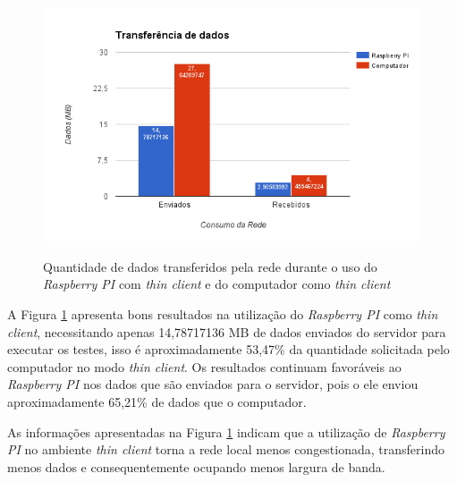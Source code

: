 \documentclass[
	12pt,				%
	openright,			%
	twoside,			%
	a4paper,			%
	chapter=TITLE,		%
	english,			%
	brazil				%
	]{abntex2}
\begin{document}
\begin{figure}[!htb]
\centering
\caption{Quantidade de dados transferidos pela rede durante o uso do \textit{Raspberry PI} com \textit{thin client} e do computador como \textit{thin client}}
\includegraphics[scale=0.8]{Imagens/net}
\label{fig:net}
\end{figure}

A Figura \ref{fig:net} apresenta bons resultados na utilização do \textit{Raspberry PI} como \textit{thin client}, necessitando apenas 14,78717136 MB de dados enviados  do servidor para executar os testes, isso é aproximadamente 53,47\% da quantidade solicitada pelo computador no modo \textit{thin client}. Os resultados continuam favoráveis ao \textit{Raspberry PI} nos dados que são enviados para o servidor, pois o ele enviou aproximadamente 65,21\% de dados que o computador.

As informações apresentadas na Figura \ref{fig:net} indicam que a utilização de \textit{Raspberry PI} no ambiente \textit{thin client} torna a rede local menos congestionada, transferindo menos dados e consequentemente ocupando menos largura de banda. 



\end{document}

